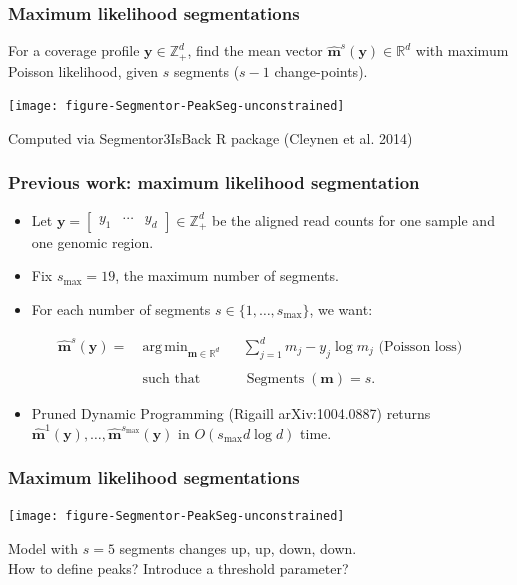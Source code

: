 \documentclass{beamer}
\DeclareMathOperator*{\argmin}{arg\,min}
\DeclareMathOperator*{\Lik}{Lik}
\DeclareMathOperator*{\Segments}{Segments}
\newcommand{\RR}{\mathbb R}
\newcommand{\ZZ}{\mathbb Z}
\begin{document}
\begin{frame}
  \frametitle{Maximum likelihood segmentations}
  For a coverage profile $\mathbf y\in\ZZ_+^d$,
  find the mean vector $\mathbf{\hat m}^s(\mathbf y)\in\RR^d$ with
  maximum Poisson likelihood, given $s$ segments ($s-1$ change-points).

  \texttt{[image: figure-Segmentor-PeakSeg-unconstrained]}

  Computed via Segmentor3IsBack R package (Cleynen et al. 2014)

\end{frame}

\begin{frame}
  \frametitle{Previous work: maximum likelihood segmentation}
  \begin{itemize}
  \item   Let $\mathbf y = 
\left[
  \begin{array}{ccc}
    y_1 & \cdots & y_d
  \end{array}
\right]
\in\ZZ_+^d$ be the aligned read counts for one sample
  and one genomic region.
\item Fix $s_{\text{max}}=19$, the maximum number of segments.
\item For each number of segments $s\in\{1, \dots,
  s_{\text{max}}\}$, we want:
  \end{itemize}
  \begin{equation*}
    \label{argmax:M}
    \begin{aligned}
      \mathbf{\hat m}^s(\mathbf y)  =\ 
      &\argmin_{\mathbf m\in\RR^{d}} && \sum_{j=1}^d
      m_j - y_j \log m_j \text{ (Poisson loss)}
      \\
      \\
      &\text{such that} && \Segments(\mathbf m)=s.
    \end{aligned}
  \end{equation*}
  \begin{itemize}
  \item Pruned Dynamic Programming (Rigaill arXiv:1004.0887) returns
    $\mathbf{\hat m}^1(\mathbf y), \dots, \mathbf{\hat
      m}^{s_{\text{max}}}(\mathbf y)$ in $O(s_{\text{max}} d\log d)$
    time.
  \end{itemize}
\end{frame}

\begin{frame}
  \frametitle{Maximum likelihood segmentations}
  \texttt{[image: figure-Segmentor-PeakSeg-unconstrained]}
  
  Model with $s=5$ segments changes up, up, down, down.\\
  How to define peaks? Introduce a threshold parameter?
\end{frame}
\end{document}
